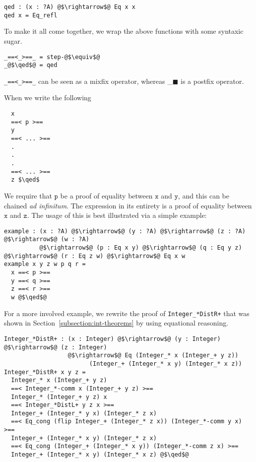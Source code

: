 \documentclass[12pt,twoside,maitrise]{dms}
\theoremstyle{definition}
\numberwithin{equation}{section}
\numberwithin{table}{chapter}
\numberwithin{figure}{chapter}
\newcommand\id[1] {\texttt{#1}}
\newcommand\latinphrase{\textit}
\renewcommand\qed{\blacksquare}
\begin{document}
\begin{verbatim}
qed : (x : ?A) @$\rightarrow$@ Eq x x
qed x = Eq_refl
\end{verbatim}

To make it all come together, we wrap the above functions with some syntaxic
sugar.

\begin{verbatim}
_==<_>==_ = step-@$\equiv$@
_@$\qed$@ = qed
\end{verbatim}

\verb|_==<_>==_| can be seen as a mixfix operator, whereas \_$\qed$ is a postfix
operator.

When we write the following

\begin{lstlisting}
  x
  ==< p >==
  y
  ==< ... >==
  .
  .
  .
  ==< ... >==
  z $\qed$
\end{lstlisting}

We require that $\id{p}$ be a proof of equality between $\id{x}$ and $\id{y}$, and this can be chained \latinphrase{ad infinitum}. The expression in its entirety is a proof of equality between $\id{x}$ and $\id{z}$. The usage of this is best illustrated via a simple example:

\begin{verbatim}
example : (x : ?A) @$\rightarrow$@ (y : ?A) @$\rightarrow$@ (z : ?A) @$\rightarrow$@ (w : ?A)
          @$\rightarrow$@ (p : Eq x y) @$\rightarrow$@ (q : Eq y z) @$\rightarrow$@ (r : Eq z w) @$\rightarrow$@ Eq x w
example x y z w p q r =
  x ==< p >==
  y ==< q >==
  z ==< r >==
  w @$\qed$@
\end{verbatim}

For a more involved example, we rewrite the proof of \verb|Integer_*DistR+| that was shown in Section~\ref{subsection:int-theorems} by using equational reasoning.

\begin{verbatim}
Integer_*DistR+ : (x : Integer) @$\rightarrow$@ (y : Integer) @$\rightarrow$@ (z : Integer)
                  @$\rightarrow$@ Eq (Integer_* x (Integer_+ y z))
                        (Integer_+ (Integer_* x y) (Integer_* x z))
Integer_*DistR+ x y z =
  Integer_* x (Integer_+ y z)
  ==< Integer_*-comm x (Integer_+ y z) >==
  Integer_* (Integer_+ y z) x
  ==< Integer_*DistL+ y z x >==
  Integer_+ (Integer_* y x) (Integer_* z x)
  ==< Eq_cong (flip Integer_+ (Integer_* z x)) (Integer_*-comm y x) >==
  Integer_+ (Integer_* x y) (Integer_* z x)
  ==< Eq_cong (Integer_+ (Integer_* x y)) (Integer_*-comm z x) >==
  Integer_+ (Integer_* x y) (Integer_* x z) @$\qed$@
\end{verbatim}
\end{document}
